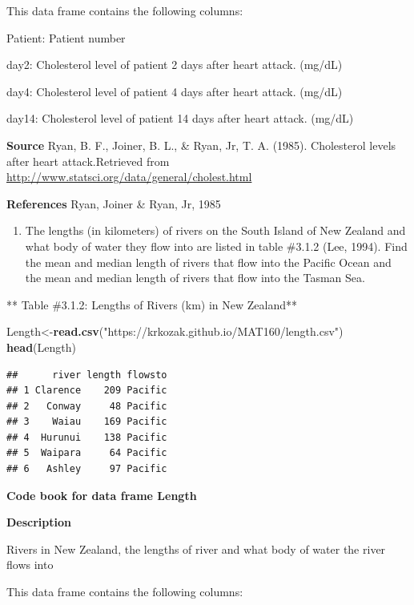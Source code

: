 \documentclass[
]{book}
\newenvironment{Shaded}{\begin{snugshade}}{\end{snugshade}}
\newcommand{\KeywordTok}[1]{\textcolor[rgb]{0.13,0.29,0.53}{\textbf{#1}}}
\newcommand{\NormalTok}[1]{#1}
\newcommand{\StringTok}[1]{\textcolor[rgb]{0.31,0.60,0.02}{#1}}
\providecommand{\tightlist}{%
  \setlength{\itemsep}{0pt}\setlength{\parskip}{0pt}}
\begin{document}
This data frame contains the following columns:

Patient: Patient number

day2: Cholesterol level of patient 2 days after heart attack. (mg/dL)

day4: Cholesterol level of patient 4 days after heart attack. (mg/dL)

day14: Cholesterol level of patient 14 days after heart attack. (mg/dL)

\textbf{Source}
Ryan, B. F., Joiner, B. L., \& Ryan, Jr, T. A. (1985). Cholesterol levels after heart attack.Retrieved from \url{http://www.statsci.org/data/general/cholest.html}

\textbf{References}
Ryan, Joiner \& Ryan, Jr, 1985

\begin{enumerate}
\def\labelenumi{\arabic{enumi}.}
\setcounter{enumi}{1}
\tightlist
\item
  The lengths (in kilometers) of rivers on the South Island of New Zealand and what body of water they flow into are listed in table \#3.1.2 (Lee, 1994). Find the mean and median length of rivers that flow into the Pacific Ocean and the mean and median length of rivers that flow into the Tasman Sea.
\end{enumerate}

** Table \#3.1.2: Lengths of Rivers (km) in New Zealand**

\begin{Shaded}
\begin{Highlighting}[]
\NormalTok{Length<-}\KeywordTok{read.csv}\NormalTok{(}\StringTok{"https://krkozak.github.io/MAT160/length.csv"}\NormalTok{)}
\KeywordTok{head}\NormalTok{(Length)}
\end{Highlighting}
\end{Shaded}

\begin{verbatim}
##      river length flowsto
## 1 Clarence    209 Pacific
## 2   Conway     48 Pacific
## 3    Waiau    169 Pacific
## 4  Hurunui    138 Pacific
## 5  Waipara     64 Pacific
## 6   Ashley     97 Pacific
\end{verbatim}

\textbf{Code book for data frame Length}

\textbf{Description}

Rivers in New Zealand, the lengths of river and what body of water the river flows into

This data frame contains the following columns:
\end{document}
